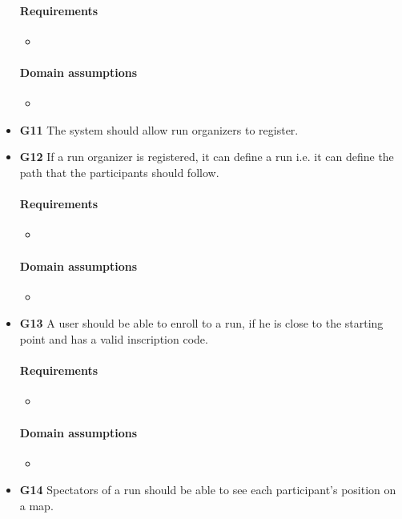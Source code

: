 \begin{itemize}
    \paragraph{Requirements}
   \begin{itemize}
       \item 
   \end{itemize}
   \paragraph{Domain assumptions}
   \begin{itemize}
       \item 
   \end{itemize}
    \item \textbf{G11} The system should allow run organizers to register.
    \item \textbf{G12} If a run organizer is registered, it can define a run i.e. it can define the path that the participants should follow.
    \paragraph{Requirements}
   \begin{itemize}
       \item 
   \end{itemize}
   \paragraph{Domain assumptions}
   \begin{itemize}
       \item 
   \end{itemize}
    \item \textbf{G13} A user should be able to enroll to a run, if he is close to the starting point and has a valid inscription code.
    \paragraph{Requirements}
   \begin{itemize}
       \item 
   \end{itemize}
   \paragraph{Domain assumptions}
   \begin{itemize}
       \item 
   \end{itemize}
    \item \textbf{G14} Spectators of a run should be able to see each participant's position on a map.

\end{itemize}
